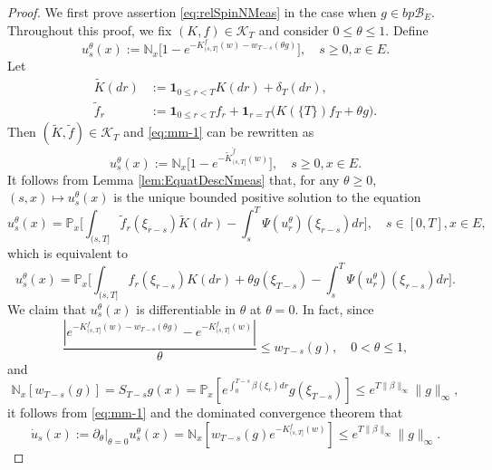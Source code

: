 \begin{proof}
	We first prove assertion \eqref{eq:relSpinNMeas} in the case when $g \in bp\mathscr B_E$.
	Throughout this proof, we fix $(K,f) \in \mathcal K_T$ and consider $0 \leq \theta \leq 1$.
	Define
\begin{equation}\label{eq:mm-1}
	u_s^\theta(x)
	:=	\mathbb N_x \big[ 1 - e^{ - K_{(s, T]}^f(w) - w_{T-s}(\theta g)} \big],
	\quad s \geq 0, x\in E.
\end{equation}
	Let
\[\begin{split}
	\tilde K(dr)
	&:=	\mathbf 1_{0\leq r<T} K(dr) + \delta_T (dr), \\
	\tilde f_r
	&:=	\mathbf 1_{0\leq r<T} f_r + \mathbf 1_{r=T} \big( K(\{T\}) f_T + \theta g \big).
\end{split}\]
	Then $(\tilde K, \tilde f) \in \mathcal K_T$ and \eqref{eq:mm-1} can be rewritten as
\[
	u_s^\theta(x)
	:=	\mathbb N_x \big[ 1 - e^{ - \tilde K_{(s, T]}^{\tilde f} (w)} \big],
	\quad s \geq 0, x\in E.
\]
	It follows from Lemma \ref{lem:EquatDescNmeas} that, for any
$\theta \geq 0$, $(s,x) \mapsto u^\theta_s(x)$ is the unique bounded positive solution to the equation
\[	
	u_s^\theta(x)
	= \mathbb P_{x} \Big[ \int_{(s,T]} \tilde f_r(\xi_{r-s}) \tilde K(dr) - \int_s^T \Psi (u_r^\theta) (\xi_{r-s}) dr \Big],
	\quad s\in [0,T],x\in E,
\]
	which is equivalent to
\begin{equation}\label{eq:mewth}
	u_s^\theta(x)
    = \mathbb P_{x} \Big[\int_{(s,T]} f_r(\xi_{r-s}) K(dr) + \theta g(\xi_{T-s}) - \int_s^T \Psi(u^\theta_r)(\xi_{r-s}) dr\Big].
\end{equation}
	We claim that $u_s^\theta(x)$ is differentiable in $\theta$ at $\theta = 0$.
	In fact, since
\begin{equation}\label{eq:sbN-1}
	\frac {|e^{-K_{(s, T]}^f(w)-w_{T-s}(\theta g)} - e^{-K_{(s, T]}^f(w)}|} {\theta}
	\leq w_{T-s}(g),
	\quad 0 < \theta \leq 1,
\end{equation}
	and
\begin{equation}
\label{eq:sbN-2}
	\mathbb N_x[w_{T-s}(g)]
	= S_{T-s} g (x)
	= \mathbb P_x[e^{\int_0^{T-s} \beta(\xi_r) dr} g(\xi_{T-s})]
	\leq e^{T \|\beta\|_\infty} \|g\|_\infty,
\end{equation}
	it follows from \eqref{eq:mm-1} and the dominated convergence theorem that
\begin{equation}
\label{eq:mm-3}
	\dot u_s(x)
	:= \partial_\theta|_{\theta=0} u_s^\theta(x)
	= \mathbb N_x[w_{T-s}(g) e^{-K^f_{(s,T]}(w)}]
	\leq e^{T \|\beta\|_\infty} \|g\|_\infty.
\end{equation}

\end{proof}

